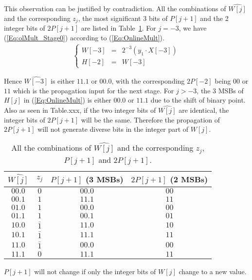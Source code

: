 \documentclass[a4paper, 11pt]{article}
\newtheorem{Ob}{\hskip\parindent\bf{Observation}}[]
\begin{document}
This observation can be justified by contradiction. All the combinations of $\widehat{W[j]}$ and the corresponding $z_j$, the most significant 3 bits of $P[j+1]$ and the 2 integer bits of $2P[j+1]$ are listed in Table~\ref{Tab:Observation1}. For $j=-3$, we have (\ref{Eq:olMult_Stage0}) according to (\ref{Eq:OnlineMult}).
\begin{eqnarray}\label{Eq:olMult_Stage0}
\left\{\begin{matrix}
    W[-3] & = & 2^{-3}(y_1\cdot X[-3])\\
    H[-2] & = & W[-3]
\end{matrix}\right.
\end{eqnarray}

Hence $\widehat{W[-3]}$ is either $11.1$ or $00.0$, with the corresponding $2P[-2]$ being $00$ or $11$ which is the propagation input for the next stage. For $j>-3$, the 3 MSBs of $H[j]$ in (\ref{Eq:OnlineMult}) is either $00.0$ or $11.1$ due to the shift of binary point. Also as seen in Table.xxx, if the two integer bits of $\widehat{W[j]}$ are identical, the integer bits of $2P[j+1]$ will be the same. Therefore the propagation of $2P[j+1]$ will not generate diverse bits in the integer part of $W[j]$.
%
\begin{table}[htbp]
\caption{All the combinations of $\widehat{W[j]}$ and the corresponding $z_j$, $P[j+1]$ and $2P[j+1]$.}
\centering
\begin{tabular}{c|ccc}
\toprule
 $\widehat{W[j]}$ & $z_j$ & $P[j+1]$ (3 MSBs)  & $2P[j+1]$ (2 MSBs) \\ \midrule
 $00.0$ & $0$ & $00.0$ & $00$\\
 $00.1$ & $1$ & $11.1$ & $11$\\
 $01.0$ & $1$ & $00.0$ & $00$\\
 $01.1$ & $1$ & $00.1$ & $01$\\
 $10.0$ & $\bar{1}$ & $11.0$ & $10$\\
 $10.1$ & $\bar{1}$ & $11.1$ & $11$\\
 $11.0$ & $\bar{1}$ & $00.0$ & $00$\\
 $11.1$ & $0$ & $11.1$ & $11$\\ \bottomrule
\end{tabular}
\label{Tab:Observation1}
\end{table}

\begin{Ob}\label{Ob:Ob2}
    $P[j+1]$ will not change if only the integer bits of $W[j]$ change to a new value.
\end{Ob}
\end{document}
